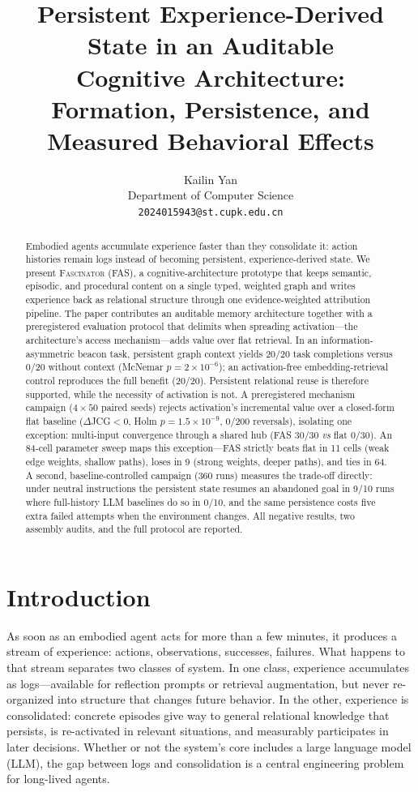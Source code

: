 \documentclass[10pt,a4paper]{article}
\title{\bfseries Persistent Experience-Derived State in an Auditable\\
Cognitive Architecture:\\
Formation, Persistence, and Measured Behavioral Effects}
\author{Kailin Yan\\ \small Department of Computer Science\\ \small \texttt{2024015943@st.cupk.edu.cn}}
\date{}
\begin{document}
\maketitle

\begin{abstract}
Embodied agents accumulate experience faster than they consolidate it: action histories remain logs instead of becoming persistent, experience-derived state. We present \textsc{Fascinator} (FAS), a cognitive-architecture prototype that keeps semantic, episodic, and procedural content on a single typed, weighted graph and writes experience back as relational structure through one evidence-weighted attribution pipeline. The paper contributes an auditable memory architecture together with a preregistered evaluation protocol that delimits when spreading activation---the architecture's access mechanism---adds value over flat retrieval. In an information-asymmetric beacon task, persistent graph context yields 20/20 task completions versus 0/20 without context (McNemar $p{=}2\times10^{-6}$); an activation-free embedding-retrieval control reproduces the full benefit (20/20). Persistent relational reuse is therefore supported, while the necessity of activation is not. A preregistered mechanism campaign ($4\times50$ paired seeds) rejects activation's incremental value over a closed-form flat baseline ($\Delta$JCG${<}0$, Holm $p{=}1.5\times10^{-9}$, 0/200 reversals), isolating one exception: multi-input convergence through a shared hub (FAS 30/30 \emph{vs} flat 0/30). An 84-cell parameter sweep maps this exception---FAS strictly beats flat in 11 cells (weak edge weights, shallow paths), loses in 9 (strong weights, deeper paths), and ties in 64. A second, baseline-controlled campaign (360 runs) measures the trade-off directly: under neutral instructions the persistent state resumes an abandoned goal in 9/10 runs where full-history LLM baselines do so in 0/10, and the same persistence costs five extra failed attempts when the environment changes. All negative results, two assembly audits, and the full protocol are reported.
\end{abstract}

\section{Introduction}
\label{sec:intro}

As soon as an embodied agent acts for more than a few minutes, it produces a stream of experience: actions, observations, successes, failures. What happens to that stream separates two classes of system. In one class, experience accumulates as logs---available for reflection prompts or retrieval augmentation, but never re-organized into structure that changes future behavior. In the other, experience is consolidated: concrete episodes give way to general relational knowledge that persists, is re-activated in relevant situations, and measurably participates in later decisions. Whether or not the system's core includes a large language model (LLM), the gap between logs and consolidation is a central engineering problem for long-lived agents.
\end{document}
